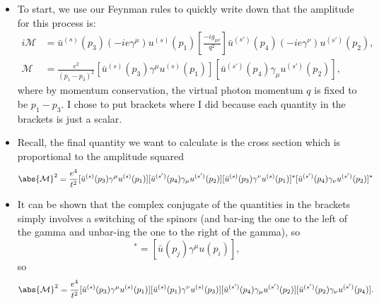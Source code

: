 \begin{itemize}
\begin{center}
        \end{center}
    \item To start, we use our Feynman rules to quickly write down that the amplitude for this process is:
        \begin{align*}
            i\mathcal{M} &= \bar{u}^{(s)}(p_3)(-ie\gamma^{\mu})u^{(s)}(p_1) \left[ \frac{-ig_{\mu\nu}}{q^2} \right] \bar{u}^{(s')}(p_4)(-ie\gamma^{\nu})u^{(s')}(p_2), \\
            \mathcal{M} &= \frac{e^2}{(p_1-p_3)^2} [\bar{u}^{(s)}(p_3)\gamma^{\mu}u^{(s)}(p_1)][\bar{u}^{(s')}(p_4)\gamma_{\mu}u^{(s')}(p_2)],
        \end{align*}
        where by momentum conservation, the virtual photon momentum $q$ is fixed to be $p_1 - p_3$. I chose to put brackets where I did because each quantity in the brackets is just a scalar. 
    \item Recall, the final quantity we want to calculate is the cross section which is proportional to the amplitude squared
        \begin{equation*}
            \abs{\mathcal{M}}^2 = \frac{e^4}{t^2} [\bar{u}^{(s)}(p_3)\gamma^{\mu}u^{(s)}(p_1)][\bar{u}^{(s')}(p_4)\gamma_{\mu}u^{(s')}(p_2)] [\bar{u}^{(s)}(p_3)\gamma^{\nu}u^{(s)}(p_1)]^* [\bar{u}^{(s')}(p_4)\gamma_{\nu}u^{(s')}(p_2)]^*
        \end{equation*}
    \item It can be shown that the complex conjugate of the quantities in the brackets simply involves a switching of the spinors (and bar-ing the one to the left of the gamma and unbar-ing the one to the right of the gamma), so
        \begin{equation*}
            [\bar{u}(p_i)\gamma^{\mu}u(p_j)]^* = [\bar{u}(p_j)\gamma^{\mu}u(p_i)],
        \end{equation*}
        so
        \begin{equation*}
            \abs{\mathcal{M}}^2 = \frac{e^4}{t^2} [\bar{u}^{(s)}(p_3)\gamma^{\mu}u^{(s)}(p_1)][\bar{u}^{(s)}(p_1)\gamma^{\nu}u^{(s)}(p_3)] [\bar{u}^{(s')}(p_4)\gamma_{\mu}u^{(s')}(p_2)][\bar{u}^{(s')}(p_2)\gamma_{\nu}u^{(s')}(p_4)].

\end{equation*}
\end{itemize}

